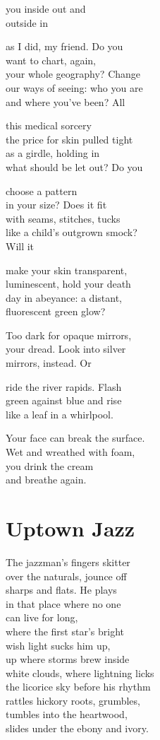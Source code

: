 \documentclass[twoside,10pt]{book}
\begin{document}
you inside out and\\
outside in

as I did, my friend. Do you\\
want to chart, again,\\
your whole geography? Change\\
our ways of seeing: who you are\\
and where you've been? All

this medical sorcery\\
the price for skin pulled tight\\
as a girdle, holding in\\
what should be let out? Do you

choose a pattern\\
in your size? Does it fit\\
with seams, stitches, tucks\\
like a child's outgrown smock?\\
Will it

make your skin transparent,\\
luminescent, hold your death\\
day in abeyance: a distant,\\
fluorescent green glow?

Too dark for opaque mirrors,\\
your dread. Look into silver\\
mirrors, instead. Or

ride the river rapids. Flash\\
green against blue and rise\\
like a leaf in a whirlpool.

Your face can break the surface.\\
Wet and wreathed with foam,\\
you drink the cream\\
and breathe again.


\clearpage
\section{Uptown Jazz}

The jazzman's fingers skitter\\
over the naturals, jounce off\\
sharps and flats. He plays\\
in that place where no one\\
can live for long,\\
where the first star's bright\\
wish light sucks him up,\\
up where storms brew inside\\
white clouds, where lightning licks\\
the licorice sky before his rhythm\\
rattles hickory roots, grumbles,\\
tumbles into the heartwood,\\
slides under the ebony and ivory.
\end{document}

